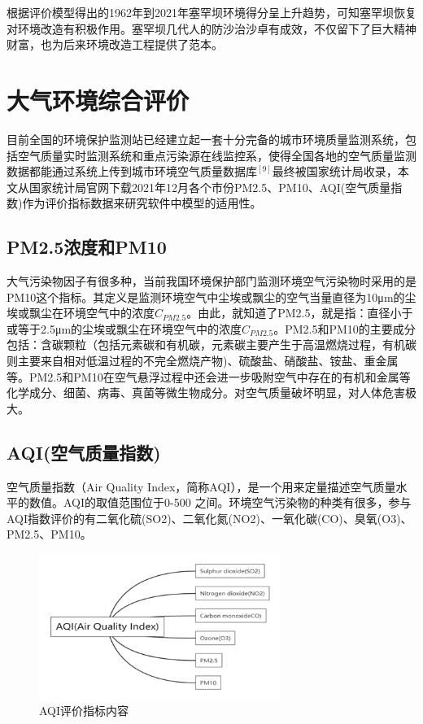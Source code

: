\documentclass[UTF8]{ctexart}
\begin{document}
根据评价模型得出的1962年到2021年塞罕坝环境得分呈上升趋势，可知塞罕坝恢复对环境改造有积极作用。塞罕坝几代人的防沙治沙卓有成效，不仅留下了巨大精神财富，也为后来环境改造工程提供了范本。

\section{大气环境综合评价}
目前全国的环境保护监测站已经建立起一套十分完备的城市环境质量监测系统，包括空气质量实时监测系统和重点污染源在线监控系，使得全国各地的空气质量监测数据都能通过系统上传到城市环境空气质量数据库$^{[9]}$最终被国家统计局收录，本文从国家统计局官网下载2021年12月各个市份PM2.5、PM10、AQI(空气质量指数)作为评价指标数据来研究软件中模型的适用性。

\subsection{PM2.5浓度和PM10}
大气污染物因子有很多种，当前我国环境保护部门监测环境空气污染物时采用的是PM10这个指标。其定义是监测环境空气中尘埃或飘尘的空气当量直径为10μm的尘埃或飘尘在环境空气中的浓度$C_{PM2.5}$。由此，就知道了PM2.5，就是指：直径小于或等于2.5μm的尘埃或飘尘在环境空气中的浓度$C_{PM2.5}$。PM2.5和PM10的主要成分包括：含碳颗粒（包括元素碳和有机碳，元素碳主要产生于高温燃烧过程，有机碳则主要来自相对低温过程的不完全燃烧产物)、硫酸盐、硝酸盐、铵盐、重金属等。PM2.5和PM10在空气悬浮过程中还会进一步吸附空气中存在的有机和金属等化学成分、细菌、病毒、真菌等微生物成分。对空气质量破坏明显，对人体危害极大。

\subsection{AQI(空气质量指数)}
空气质量指数（Air Quality Index，简称AQI），是一个用来定量描述空气质量水平的数值。AQI的取值范围位于0-500 之间。环境空气污染物的种类有很多，参与AQI指数评价的有二氧化硫(SO2)、二氧化氮(NO2)、一氧化碳(CO)、臭氧(O3)、PM2.5、PM10。

\begin{figure}[H] %
    \centering %
    \includegraphics[width=0.7\textwidth]{./picture/AQI.png} %
    \caption{AQI评价指标内容} 
\end{figure}
\end{document}
